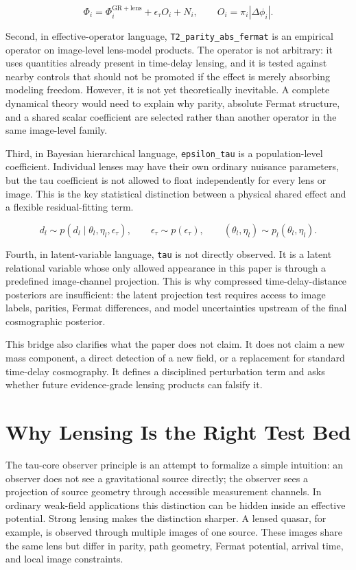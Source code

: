 \documentclass[11pt]{article}
\begin{document}
\[
\Phi_i =
\Phi_i^\mathrm{GR+lens}
+ \epsilon_\tau O_i
+ N_i,
\qquad
O_i = \pi_i |\Delta \phi_i|.
\]

Second, in effective-operator language, \texttt{T2\_parity\_abs\_fermat}
is an empirical operator on image-level lens-model products. The
operator is not arbitrary: it uses quantities already present in
time-delay lensing, and it is tested against nearby controls that should
not be promoted if the effect is merely absorbing modeling freedom.
However, it is not yet theoretically inevitable. A complete dynamical
theory would need to explain why parity, absolute Fermat structure, and
a shared scalar coefficient are selected rather than another operator in
the same image-level family.

Third, in Bayesian hierarchical language, \texttt{epsilon\_tau} is a
population-level coefficient. Individual lenses may have their own
ordinary nuisance parameters, but the tau coefficient is not allowed to
float independently for every lens or image. This is the key statistical
distinction between a physical shared effect and a flexible
residual-fitting term.

\[
d_l \sim p(d_l \mid \theta_l,\eta_l,\epsilon_\tau),
\qquad
\epsilon_\tau \sim p(\epsilon_\tau),
\qquad
(\theta_l,\eta_l)\sim p_l(\theta_l,\eta_l).
\]

Fourth, in latent-variable language, \texttt{tau} is not directly
observed. It is a latent relational variable whose only allowed
appearance in this paper is through a predefined image-channel
projection. This is why compressed time-delay-distance posteriors are
insufficient: the latent projection test requires access to image
labels, parities, Fermat differences, and model uncertainties upstream
of the final cosmographic posterior.

This bridge also clarifies what the paper does not claim. It does not
claim a new mass component, a direct detection of a new field, or a
replacement for standard time-delay cosmography. It defines a
disciplined perturbation term and asks whether future evidence-grade
lensing products can falsify it.

\section{Why Lensing Is the Right Test
Bed}\label{why-lensing-is-the-right-test-bed}

The tau-core observer principle is an attempt to formalize a simple
intuition: an observer does not see a gravitational source directly; the
observer sees a projection of source geometry through accessible
measurement channels. In ordinary weak-field applications this
distinction can be hidden inside an effective potential. Strong lensing
makes the distinction sharper. A lensed quasar, for example, is observed
through multiple images of one source. These images share the same lens
but differ in parity, path geometry, Fermat potential, arrival time, and
local image constraints.
\end{document}

